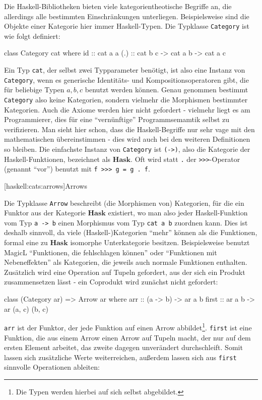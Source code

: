 \documentclass[11pt, a4paper, bibgerm]{book}
\newcommand\icode[1]{\lstinline?#1?}
\newcommand\lsubsection{}
\begin{document}
Die Haskell-Bibliotheken bieten viele kategorientheotische Begriffe an,
die allerdings alle bestimmten Einschränkungen
unterliegen. Beispielsweise sind die Objekte einer Kategorie hier immer
Haskell-Typen. Die Typklasse \icode{Category} ist wie folgt definiert:
\begin{code}
class Category cat where
  id   :: cat a a
  (.)  :: cat b c -> cat a b -> cat a c
\end{code}
Ein Typ \icode{cat}, der selbst zwei Typparameter benötigt, ist also eine
Instanz von \icode{Category}, wenn es generische Identitäts- und
Kompositionsoperatoren gibt, die für beliebige Typen $a,b,c$ benutzt
werden können. Genau genommen bestimmt \icode{Category} also keine
Kategorien, sondern vielmehr die Morphismen bestimmter Kategorien. Auch
die Axiome werden hier nicht gefordert - vielmehr liegt es am
Programmierer, dies für eine "`vernünftige"' Programmsemamtik selbst zu
verifizieren. Man sieht hier schon, dass die Haskell-Begriffe nur sehr
vage mit den mathematischen übereinstimmen - dies wird auch bei den
weiteren Definitionen so bleiben. Die einfachste Instanz von
\icode{Category} ist \icode{(->)}, also die Kategorie der
Haskell-Funktionen, bezeichnet als $\mathbf{Hask}$.
Oft wird statt \icode{.} der \icode{>>>}-Operator (genannt "`vor"') %
benutzt mit \icode{f >>> g = g . f}. %

\lsubsection[haskell:cats:arrows]{Arrows}

Die Typklasse \icode{Arrow} beschreibt (die Morphismen von) Kategorien,
für die ein Funktor aus der Kategorie $\mathbf{Hask}$ existiert, wo man
also jeder Haskell-Funktion vom Typ \icode{a -> b} einen Morphismus vom
Typ \icode{cat a b} zuordnen kann. Dies ist deshalb sinnvoll, da viele
(Haskell-)Kategorien "`mehr"' können als die Funktionen, formal eine zu
$\mathbf{Hask}$ isomorphe Unterkategorie besitzen. Beispielsweise
benutzt MagicL "`Funktionen, die fehlschlagen können"' oder "`Funktionen
mit Nebeneffekten"' als Kategorien, die jeweils auch normale Funktionen
enthalten. Zusätzlich wird eine Operation auf Tupeln gefordert, aus der
sich ein Produkt zusammensetzen lässt - ein Coprodukt wird zunächst nicht gefordert:
\begin{code}
class (Category ar) => Arrow ar where
  arr   :: (a -> b) -> ar a b
  first :: ar a b  -> ar (a, c) (b, c)
\end{code}
\icode{arr} ist der Funktor, der jede Funktion auf einen Arrow
abbildet\footnote{Die Typen werden hierbei auf sich selbst abgebildet.}.
\icode{first} ist eine Funktion, die aus einem Arrow einen Arrow auf
Tupeln macht, der nur auf dem ersten Element arbeitet, das zweite
dagegen unverändert durchschleift. Somit lassen sich zusätzliche Werte
weiterreichen, außerdem lassen sich aus \icode{first} sinnvolle
Operationen ableiten:
\end{document}
